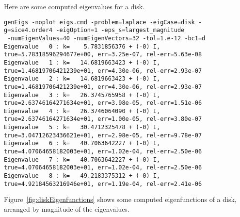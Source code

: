 Here are some computed eigenvalues for a disk.
\begin{Verbatim}[fontsize=\footnotesize]
genEigs -noplot eigs.cmd -problem=laplace -eigCase=disk -g=sice4.order4 -eigOption=1 -eps_s=largest_magnitude
 -numEigenValues=40 -numEigenVectors=32 -tol=1.e-12 -bc1=d
Eigenvalue   0 : k=    5.7831856376 + (-0) I,  true=5.78318596294677e+00, err=3.25e-07, rel-err=5.63e-08
Eigenvalue   1 : k=   14.6819663423 + (-0) I,  true=1.46819706421239e+01, err=4.30e-06, rel-err=2.93e-07
Eigenvalue   2 : k=   14.6819663423 + (-0) I,  true=1.46819706421239e+01, err=4.30e-06, rel-err=2.93e-07
Eigenvalue   3 : k=   26.3745765958 + (-0) I,  true=2.63746164271634e+01, err=3.98e-05, rel-err=1.51e-06
Eigenvalue   4 : k=   26.3746064090 + (-0) I,  true=2.63746164271634e+01, err=1.00e-05, rel-err=3.80e-07
Eigenvalue   5 : k=   30.4712325478 + (-0) I,  true=3.04712623436621e+01, err=2.98e-05, rel-err=9.78e-07
Eigenvalue   6 : k=   40.7063642227 + (-0) I,  true=4.07064658182003e+01, err=1.02e-04, rel-err=2.50e-06
Eigenvalue   7 : k=   40.7063642227 + (-0) I,  true=4.07064658182003e+01, err=1.02e-04, rel-err=2.50e-06
Eigenvalue   8 : k=   49.2183375312 + (-0) I,  true=4.92184563216946e+01, err=1.19e-04, rel-err=2.41e-06
\end{Verbatim}

Figure~\ref{fig:diskEigenfunctions} shows some computed eigenfunctions of a disk, arranged by magnitude of the
  eigenvalues.

